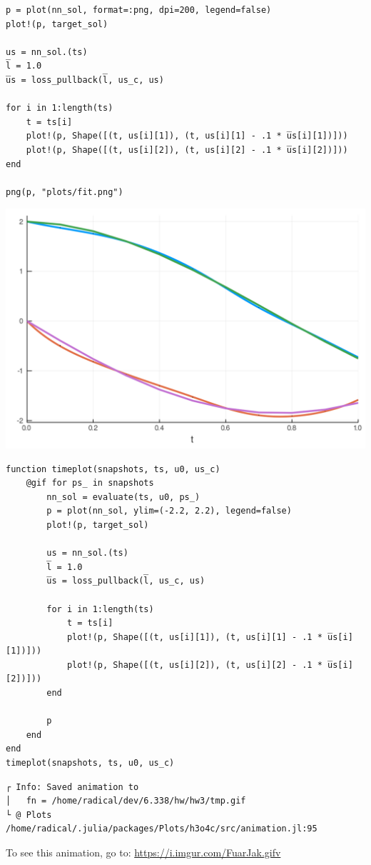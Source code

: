 \documentclass[11pt]{article}
\begin{document}
\begin{verbatim}
p = plot(nn_sol, format=:png, dpi=200, legend=false)
plot!(p, target_sol)

us = nn_sol.(ts)
l̅ = 1.0
u̅s = loss_pullback(l̅, us_c, us)

for i in 1:length(ts)
    t = ts[i]
    plot!(p, Shape([(t, us[i][1]), (t, us[i][1] - .1 * u̅s[i][1])]))
    plot!(p, Shape([(t, us[i][2]), (t, us[i][2] - .1 * u̅s[i][2])]))
end

png(p, "plots/fit.png")
\end{verbatim}

\begin{center}
\includegraphics[width=.9\linewidth]{./plots/fit.png}
\end{center}

\begin{verbatim}
function timeplot(snapshots, ts, u0, us_c)
    @gif for ps_ in snapshots
        nn_sol = evaluate(ts, u0, ps_)
        p = plot(nn_sol, ylim=(-2.2, 2.2), legend=false)
        plot!(p, target_sol)

        us = nn_sol.(ts)
        l̅ = 1.0
        u̅s = loss_pullback(l̅, us_c, us)

        for i in 1:length(ts)
            t = ts[i]
            plot!(p, Shape([(t, us[i][1]), (t, us[i][1] - .1 * u̅s[i][1])]))
            plot!(p, Shape([(t, us[i][2]), (t, us[i][2] - .1 * u̅s[i][2])]))
        end

        p
    end
end
timeplot(snapshots, ts, u0, us_c)
\end{verbatim}

\begin{verbatim}
┌ Info: Saved animation to
│   fn = /home/radical/dev/6.338/hw/hw3/tmp.gif
└ @ Plots /home/radical/.julia/packages/Plots/h3o4c/src/animation.jl:95
\end{verbatim}

To see this animation, go to: \url{https://i.imgur.com/FuarJak.gifv}
\end{document}
